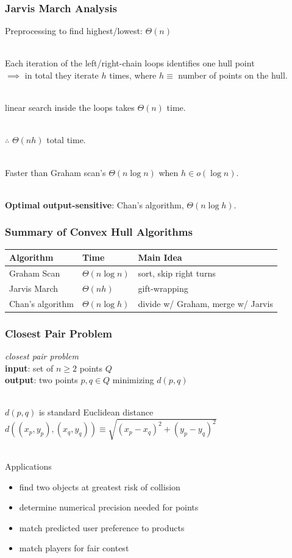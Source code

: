 \documentclass{beamer}
\newcommand{\stanza}{ \\~\ }
\begin{document}
\begin{frame} \frametitle{Jarvis March Analysis}
  Preprocessing to find highest/lowest: $\Theta(n)$ \stanza

  Each iteration of the left/right-chain loops identifies one hull point \\
  $\implies$ in total they iterate $h$ times,
  where $h \equiv $ number of points on the hull. \stanza

  linear search inside the loops takes $\Theta(n)$ time. \stanza

  $\therefore$ $\Theta(nh)$ total time. \stanza

  Faster than Graham scan's $\Theta(n \log n)$ when $h \in o(\log n).$ \stanza

  \textbf{Optimal output-sensitive}: Chan's algorithm, $\Theta(n \log h)$.
\end{frame}

\begin{frame} \frametitle{Summary of Convex Hull Algorithms}
\begin{center}
  \begin{tabular}{|l|l|l|}
    \hline
    \textbf{Algorithm} & \textbf{Time} & \textbf{Main Idea} \\ \hline
    Graham Scan & $\Theta(n \log n)$ & sort, skip right turns \\
    Jarvis March & $\Theta(nh)$ & gift-wrapping \\
    Chan's algorithm & $\Theta(n \log h)$ & divide w/ Graham, merge w/ Jarvis \\
    \hline
  \end{tabular}
\end{center}
\end{frame}

\begin{frame} \frametitle{Closest Pair Problem}
  \emph{closest pair problem} \\
  \textbf{input}: set of $n \geq 2$ points $Q$ \\
  \textbf{output}: two points $p, q \in Q$ minimizing $d(p, q)$ \stanza

  $d(p, q)$ is standard Euclidean distance \\
  $d( (x_p, y_p), (x_q, y_q) ) \equiv \sqrt{(x_p-x_q)^2+(y_p-y_q)^2}$ \stanza

  Applications
  \begin{itemize}
    \item find two objects at greatest risk of collision
    \item determine numerical precision needed for points
    \item match predicted user preference to products
    \item match players for fair contest
  \end{itemize}
\end{frame}
\end{document}
